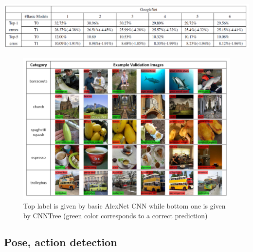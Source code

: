 \begin{frame}[allowframebreaks]
\begin{center}
	\includegraphics[scale=0.7]{figs/CNNTree_results2.PNG}
\end{center}

\framebreak

\begin{figure}

\begin{center}
	\includegraphics[scale=0.55]{figs/CNNTree_imageclassification}
\end{center}
\caption{Top label is given by basic AlexNet CNN while bottom one is given by CNNTree (green color corresponds to a correct prediction)}
\end{figure}

\end{frame}


\subsection{Pose, action detection}



